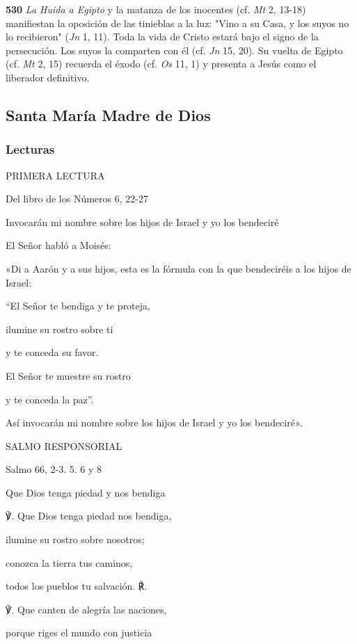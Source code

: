 \documentclass[]{article}
\begin{document}
\textbf{530} \emph{La Huida a Egipto} y la matanza de los inocentes (cf.
\emph{Mt} 2, 13-18) manifiestan la oposición de las tinieblas a la luz:
"Vino a su Casa, y los suyos no lo recibieron" (\emph{Jn} 1, 11). Toda
la vida de Cristo estará bajo el signo de la persecución. Los suyos la
comparten con él (cf. \emph{Jn} 15, 20). Su vuelta de Egipto (cf.
\emph{Mt} 2, 15) recuerda el éxodo (cf. \emph{Os} 11, 1) y presenta a
Jesús como el liberador definitivo.



\subsection{Santa María Madre de
Dios}\label{santa-maruxeda-madre-de-dios}

\subsubsection{Lecturas}\label{lecturas-9}

PRIMERA LECTURA

Del libro de los Números 6, 22-27

Invocarán mi nombre sobre los hijos de Israel y yo los bendeciré

El Señor habló a Moisés:

«Di a Aarón y a sus hijos, esta es la fórmula con la que bendeciréis a
los hijos de Israel:

``El Señor te bendiga y te proteja,

ilumine su rostro sobre ti

y te conceda su favor.

El Señor te muestre su rostro

y te conceda la paz''.

Así invocarán mi nombre sobre los hijos de Israel y yo los bendeciré».

SALMO RESPONSORIAL

Salmo 66, 2-3. 5. 6 y 8

Que Dios tenga piedad y nos bendiga

℣. Que Dios tenga piedad nos bendiga,

ilumine su rostro sobre nosotros;

conozca la tierra tus caminos,

todos los pueblos tu salvación. ℟.

℣. Que canten de alegría las naciones,

porque riges el mundo con justicia
\end{document}
